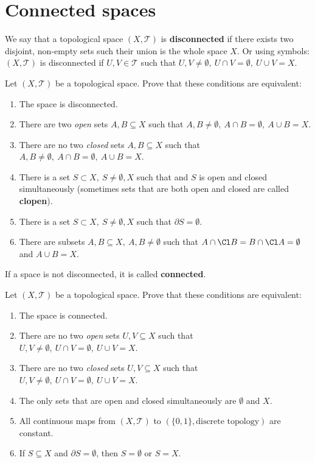 \section{Connected spaces}
We say that a topological space $(X, \mathcal T)$ is \textbf{disconnected} if there exists two disjoint, non-empty sets such their union is the whole space $X$. Or using symbols:
$(X, \mathcal T)$ is disconnected if $U,V\in \mathcal T$ such that $U,V\neq \emptyset,~U\cap V =\emptyset,~U\cup V=X$.
\begin{prob}
  Let $(X, \mathcal T)$ be a topological space. Prove that these conditions are equivalent:
  \begin{enumerate}
    \item The space is disconnected.
    \item There are two \textit{open} sets $A,B\subseteq X$ such that $A,B\neq \emptyset,~A\cap B=\emptyset,~A\cup B=X$.
    \item There are no two \textit{closed} sets $A,B\subseteq X$ such that $A,B\neq \emptyset,~A\cap B=\emptyset,~A\cup B=X$.
    \item There is a set $S\subset X,~S\neq \emptyset, X$ such that and $S$ is open and closed simultaneously (sometimes sets that are both open and closed are called
    \textbf{clopen}).
    \item There is a set $S\subset X,~S\neq \emptyset, X$ such that $\partial S=\emptyset$.
    \item There are subsets $A,B\subseteq X,~ A,B\neq \emptyset$ such that $A\cap \Cl B = B\cap \Cl A=\emptyset$ and $A\cup B=X$.
  \end{enumerate}
\end{prob}

If a space is not disconnected, it is called \textbf{connected}.

\begin{prob}
  Let $(X, \mathcal T)$ be a topological space. Prove that these conditions are equivalent:
  \begin{enumerate}
    \item The space is connected.
    \item There are no two \textit{open} sets $U,V\subseteq X$ such that $U,V\neq \emptyset,~U\cap V=\emptyset,~U\cup V=X$.
    \item There are no two \textit{closed} sets $U,V\subseteq X$ such that $U,V\neq \emptyset,~U\cap V=\emptyset,~U\cup V=X$.
    \item The only sets that are open and closed simultaneously are $\emptyset$ and $X$.
    \item All continuous maps from $(X, \mathcal T)$ to $(\{0,1\}, \text{discrete topology})$ are constant.
    \item If $S\subseteq X$ and $\partial S=\emptyset$, then $S=\emptyset$ or $S=X$.
  \end{enumerate}
\end{prob}


